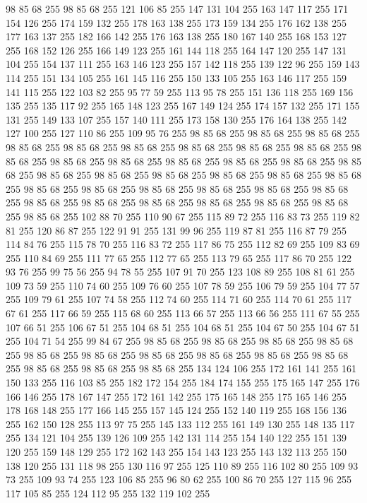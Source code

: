 98 85 68 255 98 85 68 255 121 106 85 255 147 131 104 255 163 147 117 255 171 154 126 255 174 159 132 255 178 163 138 255 173 159 134 255 176 162 138 255 177 163 137 255 182 166 142 255 176 163 138 255 180 167 140 255 168 153 127 255 168 152 126 255 166 149 123 255 161 144 118 255 164 147 120 255 147 131 104 255 154 137 111 255 163 146 123 255 157 142 118 255 139 122 96 255 159 143 114 255 151 134 105 255 161 145 116 255 150 133 105 255 163 146 117 255 159 141 115 255 122 103 82 255 95 77 59 255 113 95 78 255 151 136 118 255 169 156 135 255 135 117 92 255 165 148 123 255 167 149 124 255 174 157 132 255 171 155 131 255 149 133 107 255 157 140 111 255 173 158 130 255 176 164 138 255 142 127 100 255 127 110 86 255 109 95 76 255 98 85 68 255 98 85 68 255 98 85 68 255 98 85 68 255 98 85 68 255 98 85 68 255 98 85 68 255 98 85 68 255 98 85 68 255 98 85 68 255 98 85 68 255 98 85 68 255 98 85 68 255 98 85 68 255 98 85 68 255 98 85 68 255 98 85 68 255
98 85 68 255 98 85 68 255 98 85 68 255 98 85 68 255 98 85 68 255 98 85 68 255 98 85 68 255 98 85 68 255 98 85 68 255 98 85 68 255 98 85 68 255 98 85 68 255 98 85 68 255 98 85 68 255 98 85 68 255 98 85 68 255 98 85 68 255 98 85 68 255 102 88 70 255 110 90 67 255 115 89 72 255 116 83 73 255 119 82 81 255 120 86 87 255 122 91 91 255 131 99 96 255 119 87 81 255 116 87 79 255 114 84 76 255 115 78 70 255 116 83 72 255 117 86 75 255 112 82 69 255 109 83 69 255 110 84 69 255 111 77 65 255 112 77 65 255 113 79 65 255 117 86 70 255 122 93 76 255 99 75 56 255 94 78 55 255 107 91 70 255 123 108 89 255 108 81 61 255 109 73 59 255 110 74 60 255 109 76 60 255 107 78 59 255 106 79 59 255 104 77 57 255 109 79 61 255 107 74 58 255 112 74 60 255 114 71 60 255 114 70 61 255 117 67 61 255 117 66 59 255 115 68 60 255 113 66 57 255 113 66 56 255 111 67 55 255 107 66 51 255 106 67 51 255
104 68 51 255 104 68 51 255 104 67 50 255 104 67 51 255 104 71 54 255 99 84 67 255 98 85 68 255 98 85 68 255 98 85 68 255 98 85 68 255 98 85 68 255 98 85 68 255 98 85 68 255 98 85 68 255 98 85 68 255 98 85 68 255 98 85 68 255 98 85 68 255 98 85 68 255 134 124 106 255 172 161 141 255 161 150 133 255 116 103 85 255 182 172 154 255 184 174 155 255 175 165 147 255 176 166 146 255 178 167 147 255 172 161 142 255 175 165 148 255 175 165 146 255 178 168 148 255 177 166 145 255 157 145 124 255 152 140 119 255 168 156 136 255 162 150 128 255 113 97 75 255 145 133 112 255 161 149 130 255 148 135 117 255 134 121 104 255 139 126 109 255 142 131 114 255 154 140 122 255 151 139 120 255 159 148 129 255 172 162 143 255 154 143 123 255 143 132 113 255 150 138 120 255 131 118 98 255 130 116 97 255 125 110 89 255 116 102 80 255 109 93 73 255 109 93 74 255 123 106 85 255 96 80 62 255 100 86 70 255 127 115 96 255 117 105 85 255 124 112 95 255 132 119 102 255
